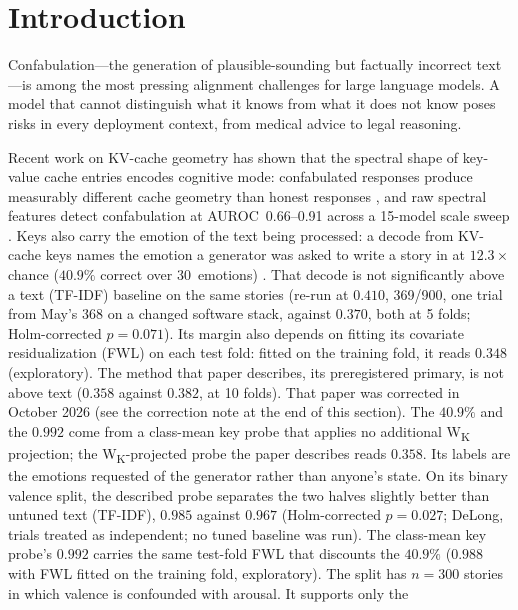 \documentclass[11pt,a4paper]{article}
\begin{document}
\section{Introduction}

Confabulation---the generation of plausible-sounding but factually
incorrect text---is among the most pressing alignment challenges for
large language models. A model that cannot distinguish what it knows from
what it does not know poses risks in every deployment context, from
medical advice to legal reasoning.

Recent work on KV-cache geometry has shown that the spectral shape of
key-value cache entries encodes cognitive mode: confabulated responses
produce measurably different cache geometry than honest responses \citep{lyra2026spectral}, and raw spectral features
detect confabulation at AUROC~0.66--0.91 across a
15-model scale sweep \citep{lyra2026techniqueii}. Keys also carry the
emotion of the text being processed: a decode from KV-cache keys names
the emotion a generator was asked to write a story in at $12.3\times$
chance ($40.9\%$ correct over 30~emotions) \citep{lyra2026usermodel}.
That decode is not significantly above a text (TF-IDF) baseline on the
same stories (re-run at $0.410$, 369/900, one trial from May's 368 on a changed software stack, against $0.370$, both at 5 folds; Holm-corrected $p = 0.071$). Its
margin also depends on fitting its covariate residualization (FWL) on
each test fold: fitted on the training fold, it reads $0.348$ (exploratory). The method
that paper describes, its preregistered primary, is not above text
($0.358$ against $0.382$, at 10 folds). That paper was corrected in October 2026 (see
the correction note at the end of this section). The $40.9\%$ and the
$0.992$ come from a class-mean key probe that applies no additional W\textsubscript{K} projection;
the W\textsubscript{K}-projected probe the paper describes reads $0.358$.
Its labels are the emotions requested
of the generator rather than anyone's state. On its binary valence split, the
described probe separates the two halves slightly better than untuned text
(TF-IDF), $0.985$ against $0.967$ (Holm-corrected $p = 0.027$; DeLong,
trials treated as independent; no tuned baseline was run). The class-mean
key probe's $0.992$ carries the same test-fold FWL that discounts the
$40.9\%$ ($0.988$ with FWL fitted on the training fold, exploratory). The
split has $n = 300$ stories in which valence is confounded with arousal. It supports only the
\end{document}
